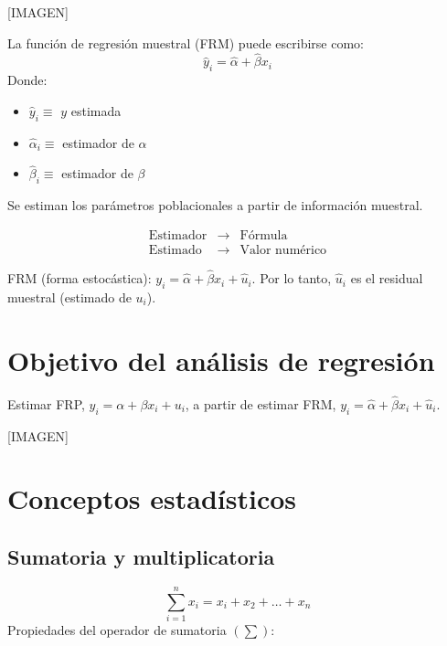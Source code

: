 \documentclass[
]{book}
\providecommand{\tightlist}{%
  \setlength{\itemsep}{0pt}\setlength{\parskip}{0pt}}
\begin{document}
{[}IMAGEN{]}

La función de regresión muestral (FRM) puede escribirse como:
\[
\hat y_i = \hat \alpha + \hat \beta x_i 
\]
Donde:

\begin{itemize}
\tightlist
\item
  \(\hat y_i \equiv\) \(y\) estimada
\item
  \(\hat \alpha_i \equiv\) estimador de \(\alpha\)
\item
  \(\hat \beta_i \equiv\) estimador de \(\beta\)
\end{itemize}

Se estiman los parámetros poblacionales a partir de información muestral.

\[
\begin{array}{ccc}
\text{Estimador} & \rightarrow & \text{Fórmula} \\
\text{Estimado} & \rightarrow & \text{Valor numérico}
\end{array}
\]

FRM (forma estocástica): \(y_i = \hat \alpha + \hat \beta x_i + \hat u_i\). Por lo tanto, \(\hat u_i\) es el residual muestral (estimado de \(u_i\)).

\hypertarget{objetivo-del-anuxe1lisis-de-regresiuxf3n}{%
\section{Objetivo del análisis de regresión}\label{objetivo-del-anuxe1lisis-de-regresiuxf3n}}

Estimar FRP, \(y_i = \alpha + \beta x_i + u_i\), a partir de estimar FRM, \(y_i = \hat \alpha + \hat \beta x_i + \hat u_i\).

{[}IMAGEN{]}

\hypertarget{conceptos-estaduxedsticos}{%
\section{Conceptos estadísticos}\label{conceptos-estaduxedsticos}}

\hypertarget{sumatoria-y-multiplicatoria}{%
\subsection{Sumatoria y multiplicatoria}\label{sumatoria-y-multiplicatoria}}

\[
\sum_{i=1}^n x_i = x_i + x_2 + \ldots + x_n
\]
Propiedades del operador de sumatoria \((\sum)\):
\end{document}
